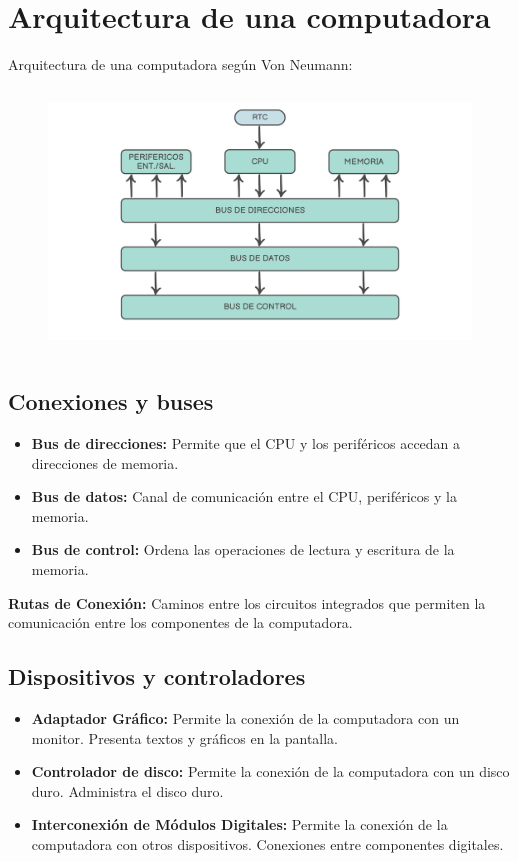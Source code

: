 \documentclass{templateNote}
\begin{document}
\newpage

\section{Arquitectura de una computadora} 
\noindent Arquitectura de una computadora según Von Neumann:
\begin{figure}[H]
    \centering
    \includegraphics[height=7cm]{img/compubasica.png}
\end{figure}

\subsection{Conexiones y buses}
\begin{itemize}
    \item \textbf{Bus de direcciones:} Permite que el CPU y los periféricos accedan a direcciones de memoria.
    \item \textbf{Bus de datos:} Canal de comunicación entre el CPU, periféricos y la memoria.
    \item \textbf{Bus de control:} Ordena las operaciones de lectura y escritura de la memoria.
\end{itemize}
\textbf{Rutas de Conexión:} Caminos entre los circuitos integrados que permiten la comunicación entre los componentes de la computadora.

\subsection{Dispositivos y controladores}
\begin{itemize}
    \item \textbf{Adaptador Gráfico:} Permite la conexión de la computadora con un monitor. Presenta textos y gráficos en la pantalla.
    \item \textbf{Controlador de disco:} Permite la conexión de la computadora con un disco duro. Administra el disco duro.
    \item \textbf{Interconexión de Módulos Digitales:} Permite la conexión de la computadora con otros dispositivos. Conexiones entre componentes digitales.
\end{itemize}
\newpage
\end{document}
